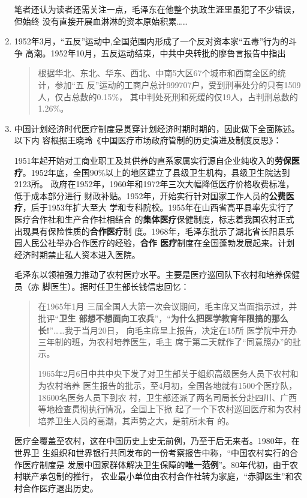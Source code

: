 \begin{enumerate}
  笔者还认为读者还需关注一点，毛泽东在他整个执政生涯里虽犯了不少错误，但始终
  没有直接开展血淋淋的资本原始积累……


\item 1952年3月，“五反”运动中,全国范围内形成了一个反对资本家“五毒”行为的斗争
  高潮。1952年10月，五反运动结束，中共中央转批的廖鲁言报告中指出
  \begin{quotation}
    根据华北、东北、华东、西北、中南5大区67个城市和西南全区的统计，参加“五
    反”运动的工商户总计999707户，受到刑事处分的只有1509人，仅占总数的0.15\%，
    其中判处死刑和死缓的仅19人，占判刑总数的1.26\%。
  \end{quotation}

\item 中国计划经济时代医疗制度是贯穿计划经济时期时期的，因此做下全面陈述。以下内
  容根据王晓玲《中国医疗市场政府管制的历史演进及制度反思》\cite{yiliaoshi}：

  1951年起开始对工商业职工及其供养的直系家属实行源自企业纯收入的\textbf{劳保医
    疗}。1952年底，全国90\%以上的地区建立了县级卫生机构，县级卫生院达到2123所。
  政府在1952年，1960年和1972年三次大幅降低医疗价格收费标准，低于成本部分进行
  财政补贴。1952年，开始实行针对国家工作人员的\textbf{公费医疗}，后于1953年扩大至大
  学和专科院校。1955年在山西省高平县率先实行了医疗合作社和生产合作社相结合
  的\textbf{集体医疗}保健制度，标志着我国农村正式出现具有保险性质的\textbf{合作医疗}制
  度。1968年，毛泽东批示了湖北省长阳县乐园人民公社举办合作医疗的经验，\textbf{合作
    医疗}制度在全国蓬勃发展起来。计划经济时期禁止私人资本进入医院。

  毛泽东以领袖强力推动了农村医疗水平。主要是医疗巡回队下农村和培养保健员（赤
  脚医生）。据时任卫生部长钱信忠回忆：
  \begin{quotation}
    在1965年1月 三届全国人大第一次会议期间，毛主席又当面指示过，并批评“\textbf{卫生
    部想不想面向工农兵}”，“\textbf{为什么把医学教育年限搞的那么长!}”……我于当月20日，
    向毛主席呈上报告，决定在15所 医学院中开办三年制的班，为农村培养医生，毛主
    席于第二天就作了“同意照办”的批示。

    1965年2月6日中共中央下发了对卫生部关于组织高级医务人员下农村和为农村培养
    医生报告的批示，至4月初，全国各地就有1500个医疗队，18600名医务人员下到农
    村，卫生部还派了两名司局长分赴四川、广西等地检查贯彻执行情况，全国上下掀
    起了一个下农村巡回医疗和为农村培养卫生人员的高潮，其声势之大，是前所未有
    的。
  \end{quotation}

  医疗全覆盖至农村，这在中国历史上史无前例，乃至于后无来者。1980年，在世界卫
  生组织和世界银行共同发布的一份考察报告中称，“中国农村实行的合作医疗制度是
  发展中国家群体解决卫生保障的\textbf{唯一范例}”。80年代初，由于农村联产承包制的推行，
  农业最小单位由农村合作社转为家庭，“赤脚医生”和农村合作医疗退出历史。


\end{enumerate}
